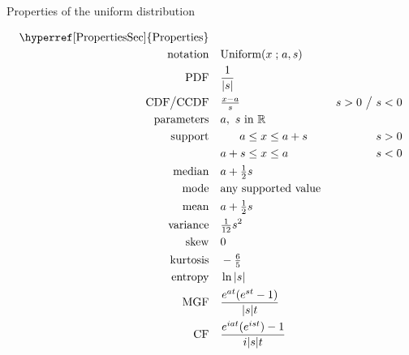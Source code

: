 

\begin{table*}[t!]
\caption[Uniform distribution -- Properties]{Properties of the uniform distribution}
\begin{align*}
\text{\hyperref[PropertiesSec]{Properties}}  \quad& \\
\text{notation} \quad & \text{Uniform}(x \given a,s) 				\checked
\\
\text{PDF} \quad & \frac{1}{|s|}								\checked
\\
\text{CDF} \big/ \text{CCDF} \quad  &  \tfrac{x-a}{s} & s>0 \ \big/ \   s<0 
\\
\text{parameters} \quad & a,\ s \text{ in }  \mathbb{R}			\checked
\\
\text{support} \quad &  \phantom{s+{}} a \leq x \leq a+s      & s>0					\checked
\\
				&    a+s \leq x \leq a    & s<0					\checked
\\
\text{median} \quad  & a + \half s							\checked
\\
\text{mode} \quad  & \text{any supported value }				\checked
\\
\text{mean} \quad  & a + \half s								\checked
\\
\text{variance} \quad  & \sfrac{1}{12}s^2						\checked
\\
\text{skew} \quad  & 0									\checked
\\
\text{kurtosis} \quad  & -\tfrac{6}{5}							\checked
\\
\text{entropy} \quad  & \ln |s|  								\checked
\\
\text{MGF} \quad  &  \frac{e^{at}( e^{st}- 1 ) }{ |s| t}		\checked
\\
\text{CF} \quad  & \frac{e^{iat} (e^{i st})-1 }{ i |s| t}		\checked
\end{align*}

\end{table*}
